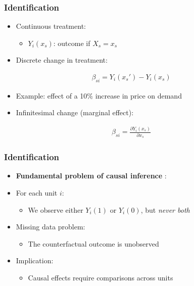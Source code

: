\documentclass[12pt, compress]{beamer}
\begin{document}
\begin{frame}
	\frametitle{Identification}

\begin{itemize}
	\item Continuous treatment:
	\begin{itemize}
		\item $Y_i(x_s)$: outcome if $X_s = x_s$ \citep{imbens2014ivperspective}
	\end{itemize}
	
	\item Discrete change in treatment:
\end{itemize}

\begin{align*}
	\beta_{si} = Y_i(x_s') - Y_i(x_s)
\end{align*}

\begin{itemize}
	\item Example: effect of a 10\% increase in price on demand
\end{itemize}

\medskip

\begin{itemize}
	\item Infinitesimal change (marginal effect):
\end{itemize}

\begin{align*}
	\beta_{si} = \frac{\partial Y_i(x_s)}{\partial x_s}
\end{align*}

\end{frame}


\begin{frame}
	\frametitle{Identification}

\begin{itemize}
	\item \textbf{Fundamental problem of causal inference} \citep{holland1986statistics}:
	
	\medskip
	
	\item For each unit $i$:
	\begin{itemize}
		\item We observe either $Y_i(1)$ or $Y_i(0)$, but \textit{never both}
	\end{itemize}
	
	\medskip
	
	\item Missing data problem:
	\begin{itemize}
		\item The counterfactual outcome is unobserved
	\end{itemize}
	
	\medskip
	
	\item Implication:
	\begin{itemize}
		\item Causal effects require comparisons across units
	\end{itemize}

\end{itemize}

\end{frame}
\end{document}
